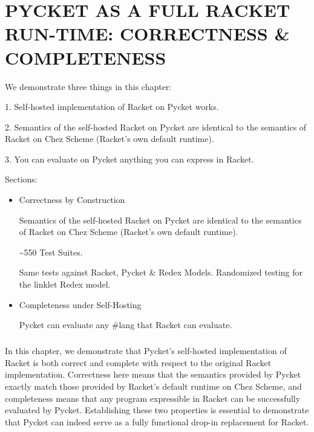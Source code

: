 \chapter[\texorpdfstring{PYCKET AS A FULL RACKET RUN-TIME: CORRECTNESS \& COMPLETENESS}
                          {5. Validation}]{PYCKET AS A FULL RACKET RUN-TIME: CORRECTNESS \& COMPLETENESS}

	\label{chapter:validation}

	\begin{chaptersynopsis}
		\footnotesize

        We demonstrate three things in this chapter:

        1. Self-hosted implementation of Racket on Pycket works.

        2. Semantics of the self-hosted Racket on Pycket are identical to the semantics of Racket on Chez Scheme (Racket's own default runtime).

        3. You can evaluate on Pycket anything you can express in Racket.

        \vspace{2em}

        Sections:
		\begin{itemize}
			\item Correctness by Construction

                Semantics of the self-hosted Racket on Pycket are identical to the semantics of Racket on Chez Scheme (Racket's own default runtime).

				\textasciitilde 550 Test Suites.

				Same tests against Racket, Pycket \& Redex Models.
				Randomized testing for the linklet Redex model.
			\item Completeness under Self-Hosting

                Pycket can evaluate any \#lang that Racket can evaluate.
		\end{itemize}
    \end{chaptersynopsis}

	\paragraph{}%
		In this chapter, we demonstrate that Pycket's self-hosted implementation of Racket is both correct and complete with respect to the original Racket implementation. Correctness here means that the semantics provided by Pycket exactly match those provided by Racket's default runtime on Chez Scheme, and completeness means that any program expressible in Racket can be successfully evaluated by Pycket. Establishing these two properties is essential to demonstrate that Pycket can indeed serve as a fully functional drop-in replacement for Racket.

